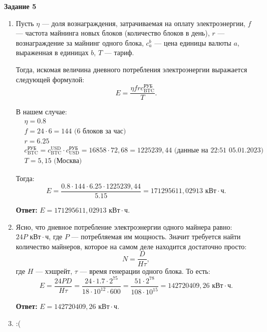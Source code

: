 \documentclass[12pt, a4paper]{extarticle}
\newenvironment*{dummyenv}{}{}
\newcommand{\mysection}[1]{
    \addcontentsline{toc}{section}{#1}
    \begin{dummyenv}
        \bfseries\large #1
    \end{dummyenv}
}
\newcommand{\Answer}[1]{\textbf{Ответ:} #1}
\begin{document}
\mysection{Задание 5}

\begin{enumerate}
    \item Пусть $\eta$ --- доля вознаграждения, затрачиваемая на оплату электроэнергии, $f$ --- 
        частота майнинга новых блоков (количество блоков в день), $r$ --- вознаграждение за
        майнинг одного блока, $c_a^b$ --- цена единицы валюты $a$, выраженная в единицах $b$, 
        $T$ --- тариф.
        
        Тогда, искомая величина дневного потребления электроэнергии выражается следующей формулой:
        \begin{equation}
            E = \frac{\eta f r c_{\text{BTC}}^{\text{РУБ}}}{T}.  
        \end{equation}
        
        В нашем случае:
        \begin{equation}
        \begin{split}
            & \eta = 0.8 \\
            & f = 24 \cdot 6 = 144 \text{ (6 блоков за час)} \\
            & r = 6.25 \\
            & c_{\text{BTC}}^{\text{РУБ}} = c_{\text{BTC}}^{\text{USD}} \cdot c_{\text{USD}}^{\text{РУБ}} 
                = 16858 \cdot 72,68 = 1225239,44 \text{ (данные на 22:51 05.01.2023)} \\
            & T = 5,15 \text{ (Москва)}
        \end{split}
        \end{equation}

        Тогда:
        \begin{equation}
            E = \frac{0.8 \cdot 144 \cdot 6.25 \cdot 1225239,44}{5.15} = 171295611,02913 
                \text{ кВт} \cdot \text{ч}.
        \end{equation}
        
        \Answer{$E = 171295611,02913 \text{ кВт} \cdot \text{ч}$.}
        
    \item Ясно, что дневное потребление электроэнергии одного майнера равно: 
        $24 P \text{ кВт} \cdot \text{ч}$, где $P$ --- потребляемая им мощность. Значит требуется
        найти количество майнеров, которое на самом деле находится достаточно просто:
        \begin{equation}
            N = \frac{D}{H \tau},
        \end{equation}
        где $H$ --- хэшрейт, $\tau$ --- время генерации одного блока. То есть:
        \begin{equation}
            E = \frac{24 PD}{H\tau} = \frac{24 \cdot 1.7 \cdot 2 ^ {75}}{18 \cdot 10 ^ {12} \cdot 600} =
                \frac{51 \cdot 2 ^ {78}}{108 \cdot 10 ^ {15}} = 142720409,26
                \text{ кВт} \cdot \text{ч}.
        \end{equation}
        
        \Answer{$E = 142720409,26 \text{ кВт} \cdot \text{ч}$.}
        
    \item :(
\end{enumerate}
\end{document}
